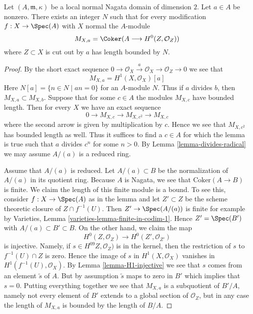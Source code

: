 \begin{lemma}
\label{lemma-bound-a-torsion}
Let $(A, \mathfrak m, \kappa)$ be a local normal Nagata domain
of dimension $2$. Let $a \in A$ be nonzero. There exists an integer $N$ such
that for every modification $f : X \to \Spec(A)$ with $X$ normal the
$A$-module
$$
M_{X, a} = \Coker(A \longrightarrow H^0(Z, \mathcal{O}_Z))
$$
where $Z \subset X$ is cut out by $a$ has length bounded by $N$.
\end{lemma}

\begin{proof}
By the short exact sequence
$
0 \to \mathcal{O}_X \xrightarrow{a} \mathcal{O}_X \to \mathcal{O}_Z \to 0
$
we see that
\begin{equation}
\label{equation-a-torsion}
M_{X, a} = H^1(X, \mathcal{O}_X)[a]
\end{equation}
Here $N[a] = \{n \in N \mid an = 0\}$ for an $A$-module $N$. Thus
if $a$ divides $b$, then $M_{X, a} \subset M_{X, b}$.
Suppose that for some $c \in A$ the modules $M_{X, c}$
have bounded length. Then for every $X$ we have an exact sequence
$$
0 \to M_{X, c} \to M_{X, c^2} \to M_{X, c}
$$
where the second arrow is given by multiplication by $c$. Hence we see that
$M_{X, c^2}$ has bounded length as well. Thus it suffices to find a $c \in A$
for which the lemma is true such that $a$ divides $c^n$ for some $n > 0$.
By Lemma \ref{lemma-divides-radical} we may assume $A/(a)$ is a reduced ring.

\medskip\noindent
Assume that $A/(a)$ is reduced. Let $A/(a) \subset B$ be the normalization
of $A/(a)$ in its quotient ring. Because $A$ is Nagata, we see that
$\text{Coker}(A \to B)$ is finite. We claim the length of this finite
module is a bound. To see this, consider $f : X \to \Spec(A)$ as in the lemma
and let $Z' \subset Z$ be the scheme theoretic closure of $Z \cap f^{-1}(U)$.
Then $Z' \to \Spec(A/(a))$ is finite for example by Varieties, Lemma
\ref{varieties-lemma-finite-in-codim-1}.
Hence $Z' = \Spec(B')$ with $A/(a) \subset B' \subset B$.
On the other hand, we claim the map
$$
H^0(Z, \mathcal{O}_Z) \to H^0(Z', \mathcal{O}_{Z'})
$$
is injective. Namely, if $s \in H^09Z, \mathcal{O}_Z)$
is in the kernel, then
the restriction of $s$ to $f^{-1}(U) \cap Z$ is zero.
Hence the image of $s$ in $H^1(X, \mathcal{O}_X)$ vanishes in
$H^1(f^{-1}(U), \mathcal{O}_X)$. By Lemma \ref{lemma-H1-injective}
we see that $s$ comes from an element $\tilde s$ of $A$. But by
assumption $\tilde s$ maps to zero in $B'$ which implies that $s = 0$.
Putting everything together we see that
$M_{X, a}$ is a subquotient of $B'/A$, namely not every element
of $B'$ extends to a global section of $\mathcal{O}_Z$, but in
any case the length of $M_{X, a}$ is bounded by the length of $B/A$.
\end{proof}

